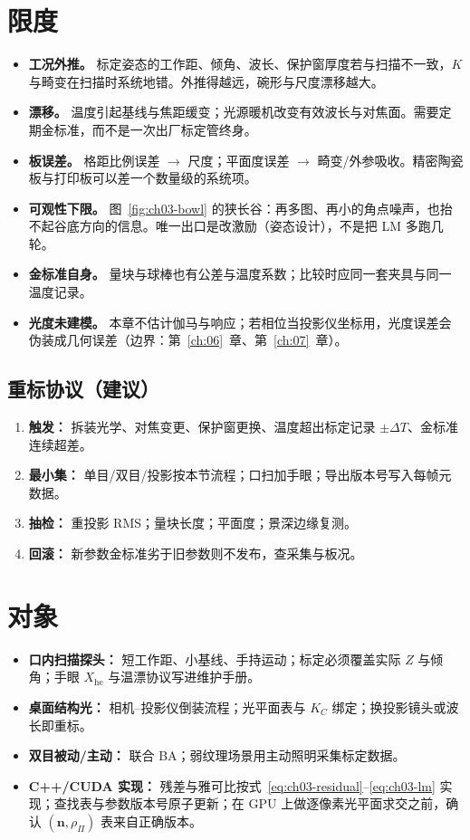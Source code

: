 \section{限度}

\begin{itemize}
  \item \textbf{工况外推。} 标定姿态的工作距、倾角、波长、保护窗厚度若与扫描不一致，$K$ 与畸变在扫描时系统地错。外推得越远，碗形与尺度漂移越大。
  \item \textbf{漂移。} 温度引起基线与焦距缓变；光源暖机改变有效波长与对焦面。需要定期金标准，而不是一次出厂标定管终身。
  \item \textbf{板误差。} 格距比例误差 $\to$ 尺度；平面度误差 $\to$ 畸变/外参吸收。精密陶瓷板与打印板可以差一个数量级的系统项。
  \item \textbf{可观性下限。} 图~\ref{fig:ch03-bowl} 的狭长谷：再多图、再小的角点噪声，也抬不起谷底方向的信息。唯一出口是改激励（姿态设计），不是把 LM 多跑几轮。
  \item \textbf{金标准自身。} 量块与球棒也有公差与温度系数；比较时应同一套夹具与同一温度记录。
  \item \textbf{光度未建模。} 本章不估计伽马与响应；若相位当投影仪坐标用，光度误差会伪装成几何误差（边界：第~\ref{ch:06}~章、第~\ref{ch:07}~章）。
\end{itemize}

\subsection{重标协议（建议）}

\begin{enumerate}
  \item \textbf{触发：} 拆装光学、对焦变更、保护窗更换、温度超出标定记录 $\pm\Delta T$、金标准连续超差。
  \item \textbf{最小集：} 单目/双目/投影按本节流程；口扫加手眼；导出版本号写入每帧元数据。
  \item \textbf{抽检：} 重投影 RMS；量块长度；平面度；景深边缘复测。
  \item \textbf{回滚：} 新参数金标准劣于旧参数则不发布，查采集与板况。
\end{enumerate}

\section{对象}

\begin{itemize}
  \item \textbf{口内扫描探头：} 短工作距、小基线、手持运动；标定必须覆盖实际 $Z$ 与倾角；手眼 $X_{\mathrm{he}}$ 与温漂协议写进维护手册。
  \item \textbf{桌面结构光：} 相机–投影仪倒装流程；光平面表与 $K_C$ 绑定；换投影镜头或波长即重标。
  \item \textbf{双目被动/主动：} 联合 BA；弱纹理场景用主动照明采集标定数据。
  \item \textbf{C++/CUDA 实现：} 残差与雅可比按式~\eqref{eq:ch03-residual}--\eqref{eq:ch03-lm} 实现；查找表与参数版本号原子更新；在 GPU 上做逐像素光平面求交之前，确认 $( \boldsymbol n,\rho_\Pi)$ 表来自正确版本。
\end{itemize}

